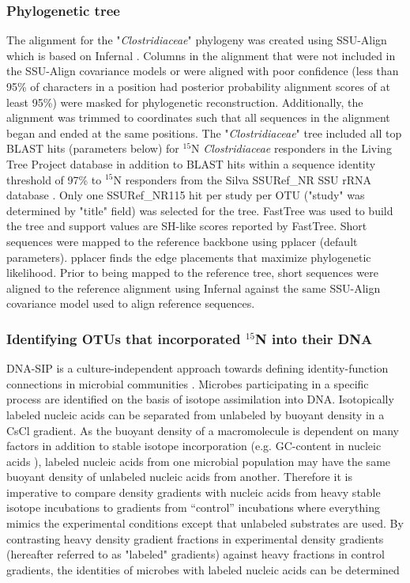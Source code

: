 \subsubsection{Phylogenetic tree}
The alignment for the "\textit{Clostridiaceae}" phylogeny was created using
SSU-Align which is based on Infernal \citep{24008419, 19307242}. Columns in the
alignment that were not included in the SSU-Align covariance models or were
aligned with poor confidence (less than 95\% of characters in a position had
posterior probability alignment scores of at least 95\%) were masked for
phylogenetic reconstruction. Additionally, the alignment was trimmed to
coordinates such that all sequences in the alignment began and ended at the
same positions. The "\textit{Clostridiaceae}" tree included all top BLAST hits
(parameters below) for $^{15}$N \textit{Clostridiaceae} responders in the
Living Tree Project database \citep{Yarza_2008} in addition to BLAST hits
within a sequence identity
threshold of 97\% to $^{15}$N responders from the Silva SSURef\_NR SSU rRNA
database \citep{17947321}. Only one SSURef\_NR115 hit per study per OTU
("study" was determined by "title" field) was selected for the tree. FastTree
\citep{20224823} was used to build the tree and support values are
SH-like scores reported by FastTree. Short sequences were mapped to the
reference backbone using pplacer \citep{Matsen_2010} (default parameters).
pplacer finds the edge placements that maximize phylogenetic likelihood. Prior
to being mapped to the reference tree, short sequences were aligned to the
reference alignment using Infernal \citep{19307242} against the same SSU-Align
covariance model used to align reference sequences.

\subsubsection{Identifying OTUs that incorporated $^{15}$N into their DNA}
DNA-SIP is a culture-independent approach towards defining identity-function
connections in microbial communities \citep{Buckley_2011, 17446886}. Microbes
participating in a specific process are identified on the basis of isotope
assimilation into DNA. Isotopically labeled nucleic acids can be
separated from unlabeled by buoyant density in a CsCl gradient. As the
buoyant density of a macromolecule is dependent on many factors in addition
to stable isotope incorporation (e.g. GC-content in nucleic acids
\citep{25139123}), labeled nucleic acids from one microbial population may
have the same buoyant density of unlabeled nucleic acids from another.
Therefore it is imperative to compare density gradients with nucleic acids
from heavy stable isotope incubations to gradients from ``control''
incubations where everything mimics the experimental conditions except that
unlabeled substrates are used. By contrasting heavy density gradient
fractions in experimental density gradients (hereafter referred to as "labeled"
gradients) against heavy fractions in control gradients, the identities of
microbes with labeled nucleic acids can be determined 

